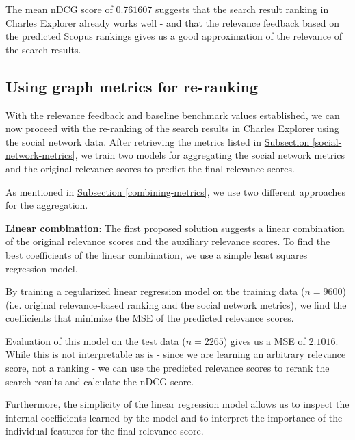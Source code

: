 The mean nDCG score of $0.761607$ suggests that the search result ranking in Charles Explorer already works well - and that the relevance feedback based on the predicted Scopus rankings gives us a good approximation of the relevance of the search results.

\subsection{Using graph metrics for re-ranking}

With the relevance feedback and baseline benchmark values established, we can now proceed with the re-ranking of the search results in Charles Explorer using the social network data.
After retrieving the metrics listed in \hyperref[social-network-metrics]{Subsection \ref*{social-network-metrics}},
we train two models for aggregating the social network metrics and the original relevance scores to predict the final relevance scores.

As mentioned in \hyperref[combining-metrics]{Subsection \ref*{combining-metrics}}, we use two different approaches for the aggregation.

\textbf{Linear combination}: The first proposed solution suggests a linear combination of the original relevance scores and the auxiliary relevance scores.
To find the best coefficients of the linear combination, we use a simple least squares regression model.

By training a regularized linear regression model on the training data ($n=9600$) (i.e. original relevance-based ranking and the social network metrics), we find the coefficients that minimize the \ac{MSE} of the predicted relevance scores.

Evaluation of this model on the test data ($n = 2265$) gives us a \ac{MSE} of $2.1016$.
While this is not interpretable as is - since we are learning an arbitrary relevance score, not a ranking - we can use the predicted relevance scores to rerank the search results and calculate the nDCG score.

Furthermore, the simplicity of the linear regression model allows us to inspect the internal coefficients learned by the model and
to interpret the importance of the individual features for the final relevance score.

